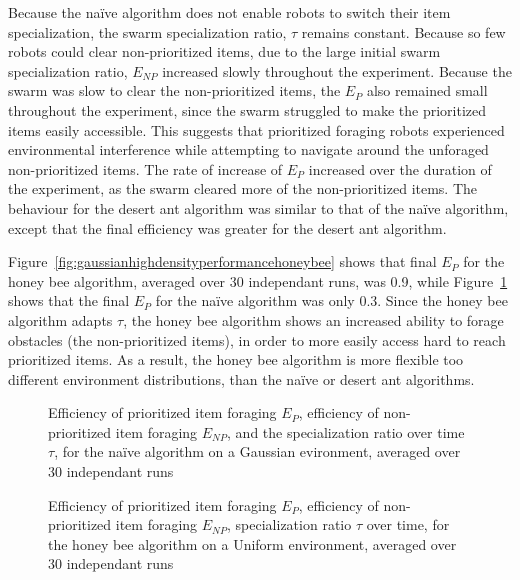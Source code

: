 Because the na\"ive algorithm does not enable robots to switch their item specialization, the swarm specialization ratio, $\tau$ remains constant. Because so few robots could clear non-prioritized items, due to the large initial swarm specialization ratio, $E_{NP}$ increased slowly throughout the experiment. Because the swarm was slow to clear the non-prioritized items, the $E_P$ also remained small throughout the experiment, since the swarm struggled to make the prioritized items easily accessible. This suggests that prioritized foraging robots experienced environmental interference while attempting to navigate around the unforaged non-prioritized items. The rate of increase of $E_P$ increased over the duration of the experiment, as the swarm cleared more of the non-prioritized items. The behaviour for the desert ant algorithm was similar to that of the na\"ive algorithm, except that the final efficiency was greater for the desert ant algorithm.


Figure~\ref{fig:gaussianhighdensityperformancehoneybee} shows that final $E_P$ for the honey bee algorithm, averaged over 30 independant runs, was 0.9, while Figure~\ref{fig:gaussianhighdensityperformancenaive} shows that the final $E_P$ for the na\"ive algorithm was only 0.3. Since the honey bee algorithm adapts $\tau$, the honey bee algorithm shows an increased ability to forage obstacles (the non-prioritized items), in order to more easily access hard to reach prioritized items. As a result, the honey bee algorithm is more flexible too different environment distributions, than the na\"ive or desert ant algorithms.




\begin{figure}[!htb]
\centering
\small
\resizebox{\textwidth}{!}{}
\caption{Efficiency of prioritized item foraging $E_P$, efficiency of non-prioritized item foraging $E_{NP}$, and the specialization ratio over time $\tau$, for the na\"ive algorithm on a Gaussian evironment, averaged over 30 independant runs}
\label{fig:gaussianhighdensityperformancenaive}
\end{figure}

\begin{figure}[!htb]
\centering
\small
\resizebox{\textwidth}{!}{}
\caption{Efficiency of prioritized item foraging $E_P$, efficiency of non-prioritized item foraging $E_{NP}$, specialization ratio $\tau$ over time, for the honey bee algorithm on a Uniform environment, averaged over 30 independant runs}
\label{fig:uniformhighdensityperformancehoneybee}
\end{figure}


